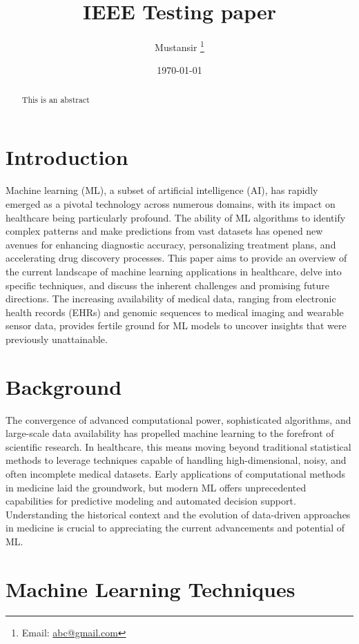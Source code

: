 \documentclass[11pt]{article}
\title{IEEE Testing paper}
\author{Mustansir \thanks{Email: \href{mailto:abc@gmail.com}{abc@gmail.com}}}
\date{\today}
\begin{document}
\maketitle

\begin{abstract}
This is an abstract
\end{abstract}

\section{Introduction}

Machine learning (ML), a subset of artificial intelligence (AI), has rapidly emerged as a pivotal technology across numerous domains, with its impact on healthcare being particularly profound. The ability of ML algorithms to identify complex patterns and make predictions from vast datasets has opened new avenues for enhancing diagnostic accuracy, personalizing treatment plans, and accelerating drug discovery processes. This paper aims to provide an overview of the current landscape of machine learning applications in healthcare, delve into specific techniques, and discuss the inherent challenges and promising future directions. The increasing availability of medical data, ranging from electronic health records (EHRs) and genomic sequences to medical imaging and wearable sensor data, provides fertile ground for ML models to uncover insights that were previously unattainable.

\section{Background}

The convergence of advanced computational power, sophisticated algorithms, and large-scale data availability has propelled machine learning to the forefront of scientific research. In healthcare, this means moving beyond traditional statistical methods to leverage techniques capable of handling high-dimensional, noisy, and often incomplete medical datasets. Early applications of computational methods in medicine laid the groundwork, but modern ML offers unprecedented capabilities for predictive modeling and automated decision support. Understanding the historical context and the evolution of data-driven approaches in medicine is crucial to appreciating the current advancements and potential of ML.

\section{Machine Learning Techniques}
\end{document}
